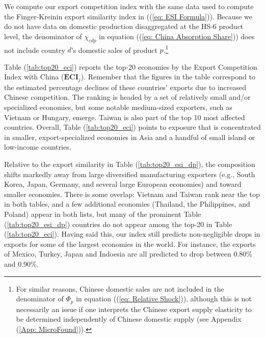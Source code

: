 \documentclass[english,12pt]{article}
\theoremstyle{definition}
\let\oldref\ref
\renewcommand{\ref}[1]{(\oldref{#1})}
\begin{document}
We compute our export competition index with the same data used to compute
the Finger-Kreinin export similarity index in (\ref{eq: ESI Formula}).
Because we do not have data on domestic production disaggregated at the HS-6
product level, the denominator of $\chi _{cdp}$ in
equation (\ref{eq: China Absorption Share}) does not include country $d$'s
domestic sales of product $p$.\footnote{For similar reasons,
Chinese domestic sales are not included in the denominator of 
$\Phi _{p}$ in equation (\ref{eq: Relative Shock}), although this is not 
necessarily an issue if one interprets the Chinese export supply elasticity
to be determined independently of Chinese domestic supply (see Appendix \ref{App: MicroFound}).}

Table \ref{tab:top20_eci} reports the top-20 economies by the Export Competition Index with China ($\boldsymbol{ECI}_{j}$). Remember that the figures in the table correspond to the estimated
percentage declines of these countries' exports due to increased Chinese competition. 
The ranking is headed by a set of relatively small and/or specialized economies, but some
notable medium-sized exporters, such as Vietnam or Hungary, emerge. Taiwan is also part of the 
top 10 most affected countries. Overall, Table \ref{tab:top20_eci} points to exposure that is concentrated in smaller, export-specialized economies in Asia and a handful of small island or low-income countries. 

\begin{table}[htbp]
\caption{Top 20 economies by Export Competition Index ($\boldsymbol{ECI}_{j}$)}
\label{tab:top20_eci}\centering

\end{table}

Relative to the export similarity in Table \ref{tab:top20_esi_dp}, the composition shifts markedly away from large diversified manufacturing exporters (e.g., South Korea, Japan, Germany, and several large European economies) and toward smaller economies. There is some overlap: Vietnam and Taiwan rank near the top in both tables, and a few additional economies (Thailand, the Philippines, and Poland) appear in both lists, but many of the prominent Table \ref{tab:top20_esi_dp} countries do not appear among the top-20 in Table \ref{tab:top20_eci}. Having said this, our index still predicts non-negligible drops in exports for some of the largest economies in the world. For instance, the exports of Mexico, Turkey, Japan and Indoesia are all predicted to drop between 0.80\% and 0.90\%.
\end{document}
